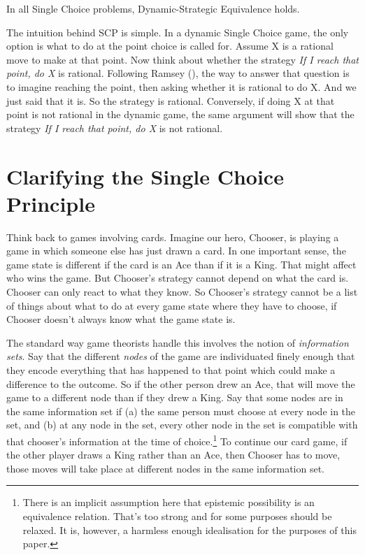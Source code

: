 \documentclass[
  10pt,
  letterpaper,
  DIV=11,
  numbers=noendperiod,
  twoside]{scrartcl}
\providecommand{\tightlist}{%
  \setlength{\itemsep}{0pt}\setlength{\parskip}{0pt}}\usepackage{longtable,booktabs,array}
\begin{document}
\begin{description}
\tightlist
\item[Single Choice Principle (SCP)]
In all Single Choice problems, Dynamic-Strategic Equivalence holds.
\end{description}

The intuition behind SCP is simple. In a dynamic Single Choice game, the
only option is what to do at the point choice is called for. Assume X is
a rational move to make at that point. Now think about whether the
strategy \emph{If I reach that point, do X} is rational. Following
Ramsey (), the way to
answer that question is to imagine reaching the point, then asking
whether it is rational to do X. And we just said that it is. So the
strategy is rational. Conversely, if doing X at that point is not
rational in the dynamic game, the same argument will show that the
strategy \emph{If I reach that point, do X} is not rational.

\section{Clarifying the Single Choice Principle}\label{sec-scp-clarify}

Think back to games involving cards. Imagine our hero, Chooser, is
playing a game in which someone else has just drawn a card. In one
important sense, the game state is different if the card is an Ace than
if it is a King. That might affect who wins the game. But Chooser's
strategy cannot depend on what the card is. Chooser can only react to
what they know. So Chooser's strategy cannot be a list of things about
what to do at every game state where they have to choose, if Chooser
doesn't always know what the game state is.

The standard way game theorists handle this involves the notion of
\emph{information sets}. Say that the different \emph{nodes} of the game
are individuated finely enough that they encode everything that has
happened to that point which could make a difference to the outcome. So
if the other person drew an Ace, that will move the game to a different
node than if they drew a King. Say that some nodes are in the same
information set if (a) the same person must choose at every node in the
set, and (b) at any node in the set, every other node in the set is
compatible with that chooser's information at the time of
choice.\footnote{There is an implicit assumption here that epistemic
  possibility is an equivalence relation. That's too strong and for some
  purposes should be relaxed. It is, however, a harmless enough
  idealisation for the purposes of this paper.} To continue our card
game, if the other player draws a King rather than an Ace, then Chooser
has to move, those moves will take place at different nodes in the same
information set.
\end{document}

